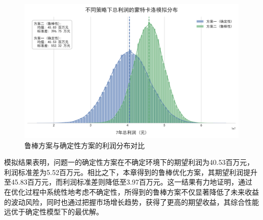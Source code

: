 \begin{figure}[H]
    \centering
    \includegraphics[width=\textwidth]{figs/4问题二/鲁棒性蒙德卡诺模拟分布图.png}
    \caption{鲁棒方案与确定性方案的利润分布对比}
    \label{fig:robustness_dist}
\end{figure}

模拟结果表明，问题一的确定性方案在不确定环境下的期望利润为40.53百万元，利润标准差为5.52百万元。相比之下，本章得到的鲁棒优化方案，其期望利润提升至45.83百万元，而利润标准差则降低至3.97百万元。这一结果有力地证明，通过在优化过程中系统性地考虑不确定性，所得到的鲁棒方案不仅显著降低了未来收益的波动风险，同时也通过把握市场增长趋势，获得了更高的期望收益，其综合性能远优于确定性模型下的最优解。

